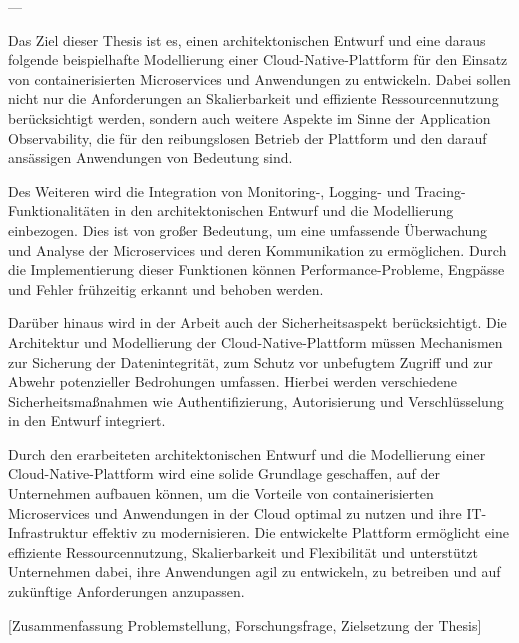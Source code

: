 --- 

Das Ziel dieser Thesis ist es, einen architektonischen Entwurf und eine daraus folgende beispielhafte Modellierung einer Cloud-Native-Plattform für den Einsatz von containerisierten Microservices und Anwendungen zu entwickeln. Dabei sollen nicht nur die Anforderungen an Skalierbarkeit und effiziente Ressourcennutzung berücksichtigt werden, sondern auch weitere Aspekte im Sinne der Application Observability, die für den reibungslosen Betrieb der Plattform und den darauf ansässigen Anwendungen von Bedeutung sind.

Des Weiteren wird die Integration von Monitoring-, Logging- und Tracing-Funktionalitäten in den architektonischen Entwurf und die Modellierung einbezogen. Dies ist von großer Bedeutung, um eine umfassende Überwachung und Analyse der Microservices und deren Kommunikation zu ermöglichen. Durch die Implementierung dieser Funktionen können Performance-Probleme, Engpässe und Fehler frühzeitig erkannt und behoben werden.

Darüber hinaus wird in der Arbeit auch der Sicherheitsaspekt berücksichtigt. Die Architektur und Modellierung der Cloud-Native-Plattform müssen Mechanismen zur Sicherung der Datenintegrität, zum Schutz vor unbefugtem Zugriff und zur Abwehr potenzieller Bedrohungen umfassen. Hierbei werden verschiedene Sicherheitsmaßnahmen wie Authentifizierung, Autorisierung und Verschlüsselung in den Entwurf integriert.

Durch den erarbeiteten architektonischen Entwurf und die Modellierung einer Cloud-Native-Plattform wird eine solide Grundlage geschaffen, auf der Unternehmen aufbauen können, um die Vorteile von containerisierten Microservices und Anwendungen in der Cloud optimal zu nutzen und ihre IT-Infrastruktur effektiv zu modernisieren. Die entwickelte Plattform ermöglicht eine effiziente Ressourcennutzung, Skalierbarkeit und Flexibilität und unterstützt Unternehmen dabei, ihre Anwendungen agil zu entwickeln, zu betreiben und auf zukünftige Anforderungen anzupassen.

[Zusammenfassung Problemstellung, Forschungsfrage, Zielsetzung der Thesis]

